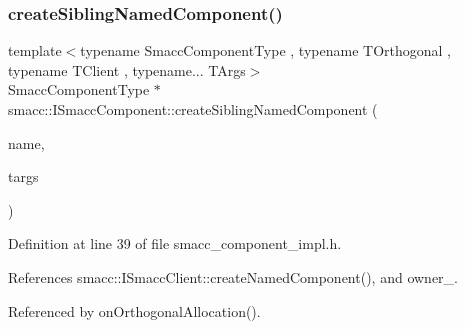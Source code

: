 \subsubsection{\texorpdfstring{create\+Sibling\+Named\+Component()}{createSiblingNamedComponent()}}
{\footnotesize\ttfamily template$<$typename Smacc\+Component\+Type , typename T\+Orthogonal , typename T\+Client , typename... T\+Args$>$ \\
Smacc\+Component\+Type $\ast$ smacc\+::\+I\+Smacc\+Component\+::create\+Sibling\+Named\+Component (\begin{DoxyParamCaption}\item[{std\+::string}]{name,  }\item[{T\+Args...}]{targs }\end{DoxyParamCaption})\hspace{0.3cm}{\ttfamily [protected]}}



Definition at line 39 of file smacc\+\_\+component\+\_\+impl.\+h.



References smacc\+::\+I\+Smacc\+Client\+::create\+Named\+Component(), and owner\+\_\+.



Referenced by on\+Orthogonal\+Allocation().


